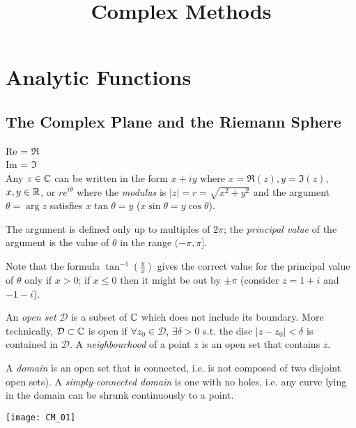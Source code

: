 \documentclass[a4paper]{article}
\begin{document}
\title{Complex Methods}

\maketitle

\newpage

\tableofcontents

\newpage

\section{Analytic Functions}

\subsection{The Complex Plane and the Riemann Sphere}

Re = $\Re$\\
Im = $\Im$\\

Any $z \in \mathbb{C}$ can be written in the form $x+iy$ where $x=\Re(z),y=\Im(z)$, $x,y\in \mathbb{R}$, or $re^{i\theta}$ where the \emph{modulus} is $|z| = r = \sqrt{x^2+y^2}$ and the argument $\theta = \arg z$ satisfies $x \tan \theta = y$ ($x\sin\theta = y\cos\theta$).

The argument is defined only up to multiples of $2\pi$; the \emph{principal value} of the argument is the value of $\theta$ in the range $(-\pi,\pi]$.

Note that the formula $\tan^{-1}(\frac{y}{x})$ gives the correct value for the principal value of $\theta$ only if $x>0$; if $x \leq 0$ then it might be out by $\pm \pi$ (consider $z=1+i$ and $-1-i$).

\begin{defi}
An \emph{open set} $\mathcal{D}$ is a subset of $\mathbb{C}$ which does not include its boundary. More technically, $\mathcal{D} \subset \mathbb{C}$ is open if $\forall z_0 \in \mathcal{D}$, $\exists \delta > 0$ s.t. the disc $|z-z_0| < \delta$ is contained in $\mathcal{D}$. A \emph{neighbourhood} of a point $z$ is an open set that contains $z$.

A \emph{domain} is an open set that is connected, i.e. is not composed of two disjoint open sets). A \emph{simply-connected domain} is one with no holes, i.e. any curve lying in the domain can be shrunk continuously to a point.
\end{defi}

\texttt{[image: CM\_01]}
\end{document}
